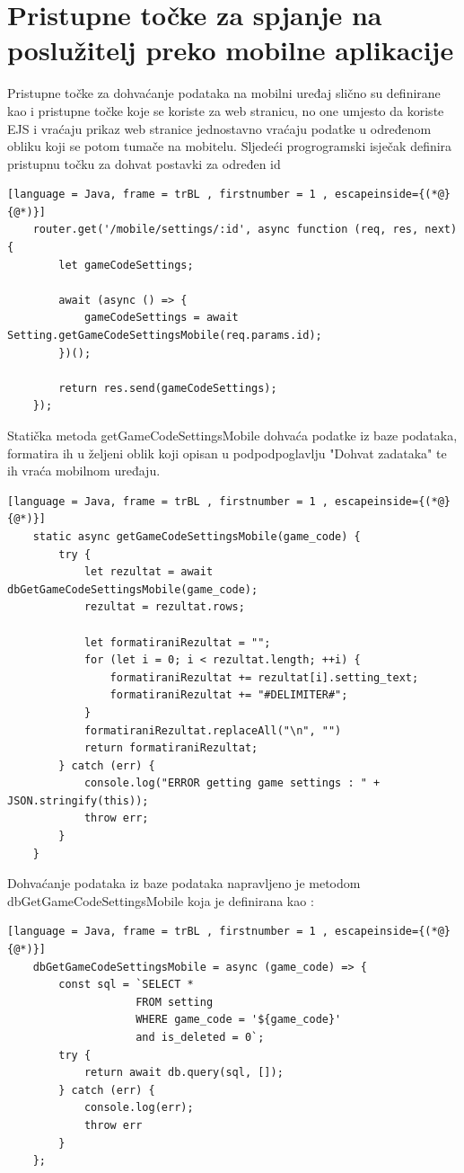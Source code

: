 \documentclass[times, utf8, zavrsni]{fer}
\begin{document}
	\section{Pristupne točke za spjanje na poslužitelj preko mobilne aplikacije}
	Pristupne točke za dohvaćanje podataka na mobilni uređaj slično su definirane kao i pristupne točke koje se koriste za web stranicu, no one umjesto da koriste EJS i vraćaju prikaz web stranice jednostavno vraćaju podatke u određenom obliku koji se potom tumače na
	mobitelu.
	Sljedeći progrogramski isječak definira pristupnu točku za dohvat postavki za određen id
	\begin{lstlisting}[language = Java, frame = trBL , firstnumber = 1 , escapeinside={(*@}{@*)}]
	router.get('/mobile/settings/:id', async function (req, res, next) {
		let gameCodeSettings;

		await (async () => {
			gameCodeSettings = await Setting.getGameCodeSettingsMobile(req.params.id);
		})();

		return res.send(gameCodeSettings);
	});
	\end{lstlisting}
	
	Statička metoda getGameCodeSettingsMobile dohvaća podatke iz baze podataka, formatira ih u željeni oblik koji opisan u podpodpoglavlju "Dohvat zadataka" te ih vraća mobilnom uređaju.
	\begin{lstlisting}[language = Java, frame = trBL , firstnumber = 1 , escapeinside={(*@}{@*)}]
    static async getGameCodeSettingsMobile(game_code) {
        try {
            let rezultat = await dbGetGameCodeSettingsMobile(game_code);
            rezultat = rezultat.rows;

            let formatiraniRezultat = "";
            for (let i = 0; i < rezultat.length; ++i) {
                formatiraniRezultat += rezultat[i].setting_text;
                formatiraniRezultat += "#DELIMITER#";
            }
            formatiraniRezultat.replaceAll("\n", "")
            return formatiraniRezultat;
        } catch (err) {
            console.log("ERROR getting game settings : " + JSON.stringify(this));
            throw err;
        }
    }
	\end{lstlisting}
	Dohvaćanje podataka iz baze podataka napravljeno je metodom dbGetGameCodeSettingsMobile koja je definirana kao :
	\begin{lstlisting}[language = Java, frame = trBL , firstnumber = 1 , escapeinside={(*@}{@*)}]
	dbGetGameCodeSettingsMobile = async (game_code) => {
		const sql = `SELECT *
					FROM setting
					WHERE game_code = '${game_code}'
					and is_deleted = 0`;
		try {
			return await db.query(sql, []);
		} catch (err) {
			console.log(err);
			throw err
		}
	};
	\end{lstlisting}	
	
\end{document}
